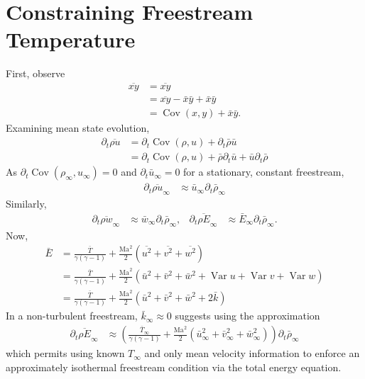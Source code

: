 \documentclass[letterpaper,11pt,nointlimits,reqno]{amsart}
\newcommand{\Mach}[1][]{\ensuremath{\mbox{Ma}_{#1}}}
\begin{document}
\section{Constraining Freestream Temperature}


First, observe
\begin{align}
  \overline{xy} &= \overline{xy}
\\              &= \overline{xy} - \bar{x} \bar{y} + \bar{x} \bar{y}
\\              &= \operatorname{Cov}\left(x,y\right) + \bar{x} \bar{y}
.
\end{align}
Examining mean state evolution,
\begin{align}
  \partial_t \overline{\rho u} &= \partial_t \operatorname{Cov}\left(\rho,u\right)
                                + \partial_t \bar{\rho} \bar{u}
\\
                               &= \partial_t \operatorname{Cov}\left(\rho,u\right)
                                + \bar{\rho} \partial_t \bar{u}
                                + \bar{u}    \partial_t \bar{\rho}
\end{align}
As $\partial_t \operatorname{Cov}\left(\rho_\infty,u_\infty\right) = 0$
and $\partial_t \bar{u}_\infty = 0$ for a stationary, constant freestream,
\begin{align}
  \partial_t \overline{\rho u}_\infty
  &\approx \bar{u}_\infty \partial_t \bar{\rho}_\infty
\end{align}
Similarly,
\begin{align}
  \partial_t \overline{\rho w}_\infty
  &\approx \bar{w}_\infty \partial_t \bar{\rho}_\infty,
&
  \partial_t \overline{\rho E}_\infty
  &\approx \bar{E}_\infty \partial_t \bar{\rho}_\infty
  .
\end{align}
Now,
\begin{align}
  \bar{E}
  &= \frac{\bar{T}}{\gamma\left( \gamma-1 \right)}
   + \frac{\Mach^2}{2}\left(\overline{u^2}+\overline{v^2}+\overline{w^2}\right)
\\
  &= \frac{\bar{T}}{\gamma\left( \gamma-1 \right)}
   + \frac{\Mach^2}{2}\left(\bar{u}^2+\bar{v}^2+\bar{w}^2
                            +\operatorname{Var}u
                            +\operatorname{Var}v
                            +\operatorname{Var}w\right)
\\
  &= \frac{\bar{T}}{\gamma\left( \gamma-1 \right)}
   + \frac{\Mach^2}{2}\left(\bar{u}^2+\bar{v}^2+\bar{w}^2+2\bar{k}\right)
\end{align}
In a non-turbulent freestream, $\bar{k}_\infty\approx{}0$ suggests
using the approximation
\begin{align}
  \partial_t \overline{\rho E}_\infty
&\approx
  \left(
         \frac{\bar{T}_\infty}{\gamma\left( \gamma-1 \right)}
       + \frac{\Mach^2}{2}\left(\bar{u}_\infty^2+\bar{v}_\infty^2+\bar{w}_\infty^2\right)
  \right)
  \partial_t \bar{\rho}_\infty
\end{align}
which permits using known $T_\infty$ and only mean velocity information
to enforce an approximately isothermal freestream condition via the
total energy equation.
\end{document}
